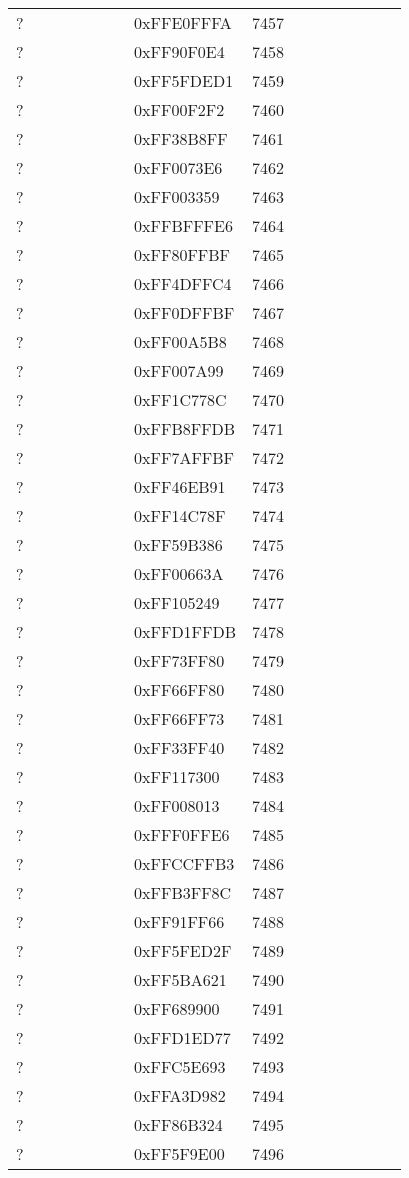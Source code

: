 \begin{longtable}{p{0.3\linewidth} p{0.3\linewidth} p{0.4\linewidth}}
? &  0xFFE0FFFA &  7457\\
? &  0xFF90F0E4 &  7458\\
? &  0xFF5FDED1 &  7459\\
? &  0xFF00F2F2 &  7460\\
? &  0xFF38B8FF &  7461\\
? &  0xFF0073E6 &  7462\\
? &  0xFF003359 &  7463\\
? &  0xFFBFFFE6 &  7464\\
? &  0xFF80FFBF &  7465\\
? &  0xFF4DFFC4 &  7466\\
? &  0xFF0DFFBF &  7467\\
? &  0xFF00A5B8 &  7468\\
? &  0xFF007A99 &  7469\\
? &  0xFF1C778C &  7470\\
? &  0xFFB8FFDB &  7471\\
? &  0xFF7AFFBF &  7472\\
? &  0xFF46EB91 &  7473\\
? &  0xFF14C78F &  7474\\
? &  0xFF59B386 &  7475\\
? &  0xFF00663A &  7476\\
? &  0xFF105249 &  7477\\
? &  0xFFD1FFDB &  7478\\
? &  0xFF73FF80 &  7479\\
? &  0xFF66FF80 &  7480\\
? &  0xFF66FF73 &  7481\\
? &  0xFF33FF40 &  7482\\
? &  0xFF117300 &  7483\\
? &  0xFF008013 &  7484\\
? &  0xFFF0FFE6 &  7485\\
? &  0xFFCCFFB3 &  7486\\
? &  0xFFB3FF8C &  7487\\
? &  0xFF91FF66 &  7488\\
? &  0xFF5FED2F &  7489\\
? &  0xFF5BA621 &  7490\\
? &  0xFF689900 &  7491\\
? &  0xFFD1ED77 &  7492\\
? &  0xFFC5E693 &  7493\\
? &  0xFFA3D982 &  7494\\
? &  0xFF86B324 &  7495\\
? &  0xFF5F9E00 &  7496\\

\end{longtable}
